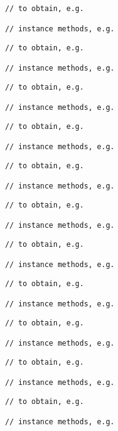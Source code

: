 \documentclass{scrartcl}
\begin{document}
    \begin{lstlisting}
        // to obtain, e.g.

        // instance methods, e.g.

    \end{lstlisting}

    \begin{lstlisting}
        // to obtain, e.g.

        // instance methods, e.g.

    \end{lstlisting}

    \begin{lstlisting}
        // to obtain, e.g.

        // instance methods, e.g.

    \end{lstlisting}

    \begin{lstlisting}
        // to obtain, e.g.

        // instance methods, e.g.

    \end{lstlisting}

    \begin{lstlisting}
        // to obtain, e.g.

        // instance methods, e.g.

    \end{lstlisting}

    \begin{lstlisting}
        // to obtain, e.g.

        // instance methods, e.g.

    \end{lstlisting}

    \begin{lstlisting}
        // to obtain, e.g.

        // instance methods, e.g.

    \end{lstlisting}

    \begin{lstlisting}
        // to obtain, e.g.

        // instance methods, e.g.

    \end{lstlisting}

    \begin{lstlisting}
        // to obtain, e.g.

        // instance methods, e.g.

    \end{lstlisting}

    \begin{lstlisting}
        // to obtain, e.g.

        // instance methods, e.g.

    \end{lstlisting}

    \begin{lstlisting}
        // to obtain, e.g.

        // instance methods, e.g.

    \end{lstlisting}
\end{document}
